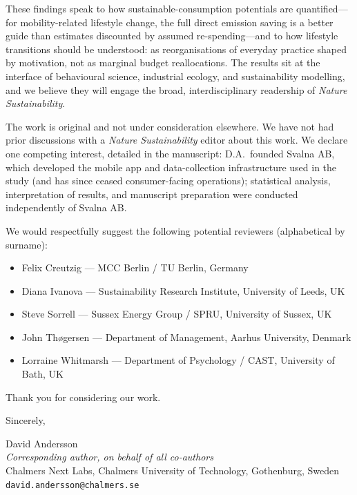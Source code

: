 \documentclass[12pt,a4paper]{article}
\begin{document}
These findings speak to how sustainable-consumption potentials are quantified---for mobility-related lifestyle change, the full direct emission saving is a better guide than estimates discounted by assumed re-spending---and to how lifestyle transitions should be understood: as reorganisations of everyday practice shaped by motivation, not as marginal budget reallocations. The results sit at the interface of behavioural science, industrial ecology, and sustainability modelling, and we believe they will engage the broad, interdisciplinary readership of \textit{Nature Sustainability}.

The work is original and not under consideration elsewhere. We have not had prior discussions with a \textit{Nature Sustainability}
editor about this work. We declare one competing interest, detailed in the manuscript: D.A.\ founded Svalna AB, which developed the mobile app and data-collection infrastructure used in the study (and has since ceased consumer-facing operations); statistical analysis, interpretation of results, and manuscript preparation were conducted independently of Svalna AB.

We would respectfully suggest the following potential reviewers (alphabetical
by surname):

\begin{itemize}[noitemsep, topsep=0.5em, leftmargin=1.5em]
  \item Felix Creutzig --- MCC Berlin / TU Berlin, Germany
  \item Diana Ivanova --- Sustainability Research Institute,
        University of Leeds, UK
  \item Steve Sorrell --- Sussex Energy Group / SPRU,
        University of Sussex, UK
  \item John Th{\o}gersen --- Department of Management,
        Aarhus University, Denmark
  \item Lorraine Whitmarsh --- Department of Psychology / CAST,
        University of Bath, UK
\end{itemize}


Thank you for considering our work.

\bigskip

Sincerely,

\vspace{2.5em}

David Andersson\\[0.2em]
\textit{Corresponding author, on behalf of all co-authors}\\[0.2em]
Chalmers Next Labs, Chalmers University of Technology, Gothenburg, Sweden\\[0.2em]
\texttt{david.andersson@chalmers.se}
\end{document}
